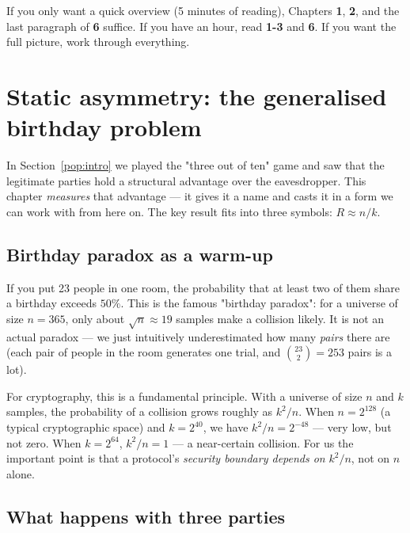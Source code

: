 \documentclass[11pt,a4paper]{article}
\begin{document}
If you only want a quick overview (5 minutes of reading), Chapters \textbf{1}, \textbf{2}, and the last paragraph of \textbf{6} suffice. If you have an hour, read \textbf{1-3} and \textbf{6}. If you want the full picture, work through everything.

\bigskip


\section{Static asymmetry: the generalised birthday problem}\label{pop:static}

In Section~\ref{pop:intro} we played the "three out of ten" game and saw that the legitimate parties hold a structural advantage over the eavesdropper. This chapter \emph{measures} that advantage --- it gives it a name and casts it in a form we can work with from here on. The key result fits into three symbols: $R \approx n/k$.

\subsection{Birthday paradox as a warm-up}

If you put 23 people in one room, the probability that at least two of them share a birthday exceeds $50\%$. This is the famous "birthday paradox": for a universe of size $n = 365$, only about $\sqrt{n} \approx 19$ samples make a collision likely. It is not an actual paradox --- we just intuitively underestimated how many \emph{pairs} there are (each pair of people in the room generates one trial, and $\binom{23}{2} = 253$ pairs is a lot).

For cryptography, this is a fundamental principle. With a universe of size $n$ and $k$ samples, the probability of a collision grows roughly as $k^2 / n$. When $n = 2^{128}$ (a typical cryptographic space) and $k = 2^{40}$, we have $k^2/n = 2^{-48}$ --- very low, but not zero. When $k = 2^{64}$, $k^2/n = 1$ --- a near-certain collision. For us the important point is that a protocol's \emph{security boundary depends on} $k^2/n$, not on $n$ alone.

\subsection{What happens with three parties}
\end{document}
